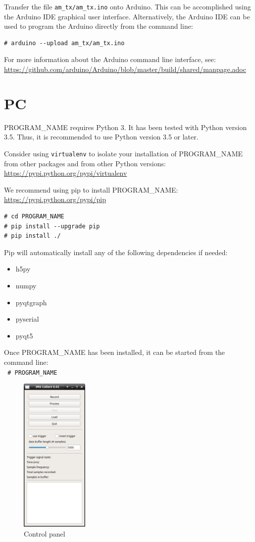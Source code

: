 \documentclass[11pt,letterpaper,article,oneside]{memoir}
\newcommand{\name}{PROGRAM\_NAME}
\begin{document}
Transfer the file \verb|am_tx/am_tx.ino| onto Arduino.  This can be accomplished
using the Arduino IDE graphical user interface.  Alternatively, the Arduino IDE
can be used to program the Arduino directly from the command line:

\begin{verbatim}
# arduino --upload am_tx/am_tx.ino
\end{verbatim}

For more information about the Arduino command line interface, see:
\url{https://github.com/arduino/Arduino/blob/master/build/shared/manpage.adoc}

\section{PC}
\label{sec:installPc}
\name{} requires Python 3. It has been tested with Python version 3.5. Thus, it
is recommended to use Python version 3.5 or later.

Consider using \texttt{virtualenv} to isolate your installation of \name{} from
other packages and from other Python versions:
\url{https://pypi.python.org/pypi/virtualenv}

We recommend using pip to install \name{}:
\url{https://pypi.python.org/pypi/pip}

\begin{verbatim}
# cd PROGRAM_NAME
# pip install --upgrade pip
# pip install ./
\end{verbatim}

Pip will automatically install any of the following dependencies if needed:
\begin{itemize}
\item h5py
\item numpy
\item pyqtgraph
\item pyserial
\item pyqt5
\end{itemize}

Once \name{} has been installed, it can be started from the command line:\\
\texttt{
\# \name{}
}

\begin{figure}[]
    \begin{center}
        \includegraphics[height=3in]{screenshot_panel}
    \end{center}
    \caption{Control panel} 
\end{figure}
\end{document}
